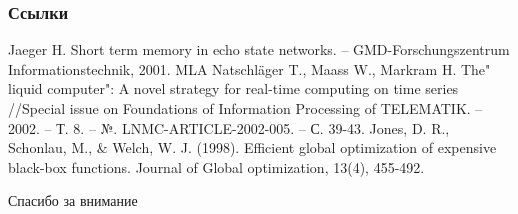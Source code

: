 \documentclass{beamer}
\begin{document}
\begin{frame}
\frametitle{Ссылки}
\footnotesize{
\begin{thebibliography}{99} %
 Jaeger H. Short term memory in echo state networks. – GMD-Forschungszentrum Informationstechnik, 2001.
MLA	
 Natschläger T., Maass W., Markram H. The" liquid computer": A novel strategy for real-time computing on time series //Special issue on Foundations of Information Processing of TELEMATIK. – 2002. – Т. 8. – №. LNMC-ARTICLE-2002-005. – С. 39-43.
 Jones, D. R., Schonlau, M., \& Welch, W. J. (1998). Efficient global optimization of expensive black-box functions. Journal of Global optimization, 13(4), 455-492.

\end{thebibliography}
}
\end{frame}


\begin{frame}
\Huge{\centerline{Спасибо за внимание}}
\end{frame}

\end{document}
